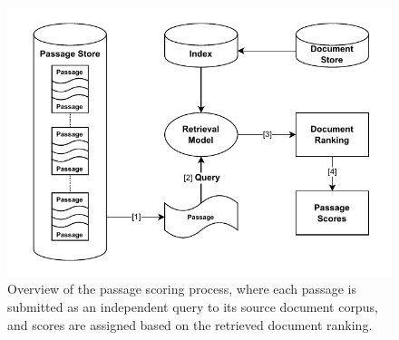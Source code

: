 \begin{figure}[t]
    \centering
    \includegraphics[width=\textwidth]{./graphics/drawio/passage_scoring.pdf}
    \caption{Overview of the passage scoring process, where each passage is submitted as an independent query to its source document corpus, and scores are assigned based on the retrieved document ranking.}
    \label{fig:passage-scoring}
\end{figure}

